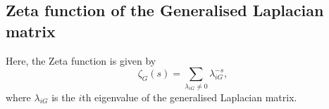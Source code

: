 \documentclass[10pt,a4paper]{article}
\begin{document}
        \subsection{Zeta function of the Generalised Laplacian matrix}
        Here, the Zeta function is given by 
        \begin{equation}
        \zeta_G(s) =  \sum_{\lambda_{iG} \neq 0} \lambda_{iG} ^{-s},
        \end{equation}
        where $\lambda_{iG}$ is the $i$th eigenvalue of the generalised Laplacian matrix.
        
\end{document}
